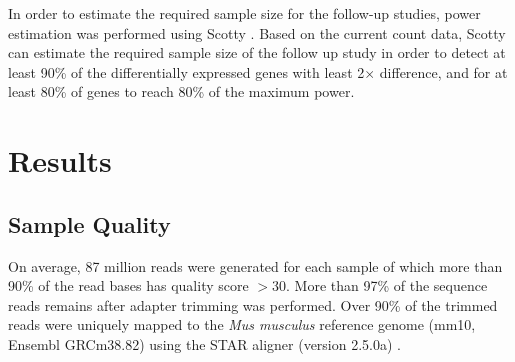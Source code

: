 \documentclass[12pt]{scrbook}
\begin{document}
In order to estimate the required sample size for the follow-up studies, power estimation was performed using Scotty \citep{Busby2013}.
Based on the current count data, Scotty can estimate the required sample size of the follow up study in order to detect at least 90\% of the differentially expressed genes with least 2$\times$ difference, and for at least 80\% of genes to reach 80\% of the maximum power.

\section{Results} 
\subsection{Sample Quality}
On average, 87 million reads were generated for each sample of which more than 90\% of the read bases has quality score $>30$.
More than 97\% of the sequence reads remains after adapter trimming was performed. 
Over 90\% of the trimmed reads were uniquely mapped to the \textit{Mus musculus} reference genome (mm10, Ensembl GRCm38.82) using the STAR aligner (version 2.5.0a) \citep{Dobin2013}.
\end{document}
